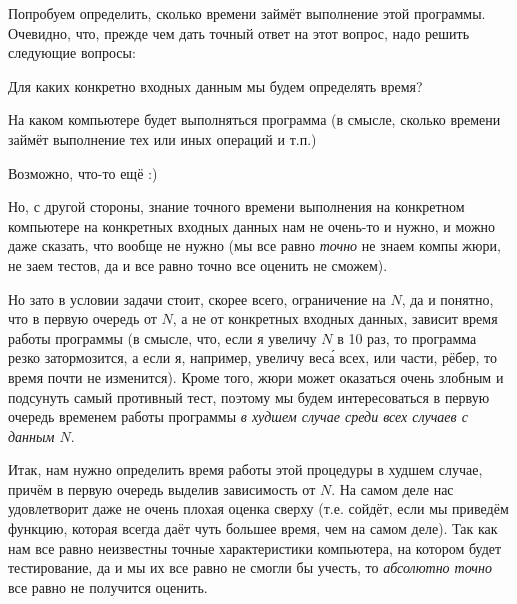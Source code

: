\documentclass[a4paper,10pt]{problems}
\begin{document}
Попробуем определить, сколько времени займёт выполнение этой программы. 
Очевидно, что, прежде чем дать точный ответ на этот вопрос, надо решить 
следующие вопросы:
\begin{ulist}
\item Для каких конкретно входных данным мы будем определять время?
\item На каком компьютере будет выполняться программа (в смысле, сколько 
времени займёт выполнение тех или иных операций и т.п.)
\item Возможно, что-то ещё :)
\end{ulist}

Но, с другой стороны, знание точного времени выполнения на конкретном 
компьютере на конкретных входных данных нам не очень-то и нужно, и можно даже 
сказать, что вообще не нужно (мы все равно \textit{точно} не знаем компы жюри, 
не заем тестов, да и все равно точно все оценить не сможем).

Но зато в условии задачи стоит, скорее всего, ограничение на $N$, да и 
понятно, что в первую очередь от $N$, а не от конкретных входных данных,
зависит время работы программы (в смысле, что, если я увеличу $N$ в 10 раз, то 
программа резко затормозится, а если я, например, увеличу вес\'{а} всех, или части, 
рёбер, то время почти не изменится). Кроме того, жюри может оказаться очень 
злобным  
и подсунуть самый противный тест, поэтому мы будем интересоваться в первую 
очередь временем работы программы \textit{в худшем случае среди всех случаев с 
данным $N$}. 


Итак, нам нужно определить время работы этой процедуры в худшем случае, причём 
в первую очередь выделив зависимость от $N$. На самом деле нас удовлетворит 
даже не очень плохая оценка сверху (т.е. сойдёт, если мы приведём функцию, 
которая всегда даёт чуть большее время, чем на самом деле). Так как нам все 
равно неизвестны точные характеристики компьютера, на котором будет 
тестирование, да и мы их все равно не смогли бы учесть, то \textit{абсолютно 
точно} все равно не получится оценить.
\end{document}
